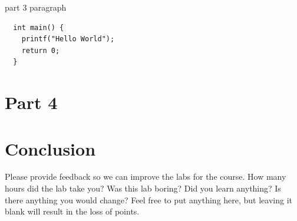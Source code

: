 \documentclass[11pt]{article}
\begin{document}
\label{sec:part-3}
part 3 paragraph

\begin{verbatim}
  int main() {
    printf("Hello World");
    return 0;
  }
\end{verbatim}

\section{Part 4}
\label{sec:part-4}

\section{Conclusion}
\label{sec:conclusion}
Please provide feedback so we can improve the labs for the course. How many
hours did the lab take you? Was this lab boring? Did you learn anything? Is
there anything you would change? Feel free to put anything here, but leaving it
blank will result in the loss of points.



\end{document}
